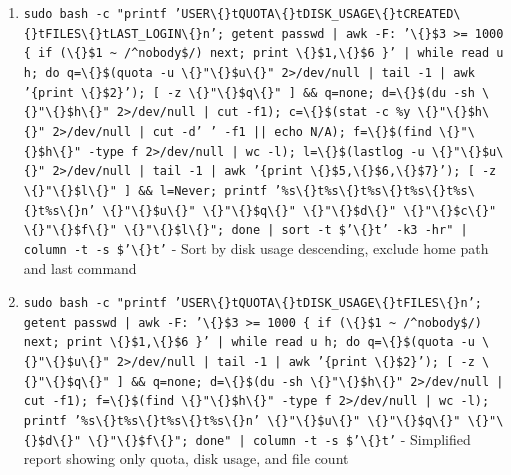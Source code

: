 \documentclass[openany]{book}
\begin{document}
\begin{enumerate}
  \item \texttt{sudo bash -c "printf 'USER\textbackslash\{\}tQUOTA\textbackslash\{\}tDISK\_USAGE\textbackslash\{\}tCREATED\textbackslash\{\}tFILES\textbackslash\{\}tLAST\_LOGIN\textbackslash\{\}n'; getent passwd | awk -F: '\textbackslash\{\}\$3 >= 1000 \{ if (\textbackslash\{\}\$1 \textasciitilde{} /\textasciicircum{}nobody\$/) next; print \textbackslash\{\}\$1,\textbackslash\{\}\$6 \}' | while read u h; do q=\textbackslash\{\}\$(quota -u \textbackslash\{\}"\textbackslash\{\}\$u\textbackslash\{\}" 2>/dev/null | tail -1 | awk '\{print \textbackslash\{\}\$2\}'); [ -z \textbackslash\{\}"\textbackslash\{\}\$q\textbackslash\{\}" ] \&\& q=none; d=\textbackslash\{\}\$(du -sh \textbackslash\{\}"\textbackslash\{\}\$h\textbackslash\{\}" 2>/dev/null | cut -f1); c=\textbackslash\{\}\$(stat -c \%y \textbackslash\{\}"\textbackslash\{\}\$h\textbackslash\{\}" 2>/dev/null | cut -d' ' -f1 || echo N/A); f=\textbackslash\{\}\$(find \textbackslash\{\}"\textbackslash\{\}\$h\textbackslash\{\}" -type f 2>/dev/null | wc -l); l=\textbackslash\{\}\$(lastlog -u \textbackslash\{\}"\textbackslash\{\}\$u\textbackslash\{\}" 2>/dev/null | tail -1 | awk '\{print \textbackslash\{\}\$5,\textbackslash\{\}\$6,\textbackslash\{\}\$7\}'); [ -z \textbackslash\{\}"\textbackslash\{\}\$l\textbackslash\{\}" ] \&\& l=Never; printf '\%s\textbackslash\{\}t\%s\textbackslash\{\}t\%s\textbackslash\{\}t\%s\textbackslash\{\}t\%s\textbackslash\{\}t\%s\textbackslash\{\}n' \textbackslash\{\}"\textbackslash\{\}\$u\textbackslash\{\}" \textbackslash\{\}"\textbackslash\{\}\$q\textbackslash\{\}" \textbackslash\{\}"\textbackslash\{\}\$d\textbackslash\{\}" \textbackslash\{\}"\textbackslash\{\}\$c\textbackslash\{\}" \textbackslash\{\}"\textbackslash\{\}\$f\textbackslash\{\}" \textbackslash\{\}"\textbackslash\{\}\$l\textbackslash\{\}"; done | sort -t \$'\textbackslash\{\}t' -k3 -hr" | column -t -s \$'\textbackslash\{\}t'} - Sort by disk usage descending, exclude home path and last command
  \item \texttt{sudo bash -c "printf 'USER\textbackslash\{\}tQUOTA\textbackslash\{\}tDISK\_USAGE\textbackslash\{\}tFILES\textbackslash\{\}n'; getent passwd | awk -F: '\textbackslash\{\}\$3 >= 1000 \{ if (\textbackslash\{\}\$1 \textasciitilde{} /\textasciicircum{}nobody\$/) next; print \textbackslash\{\}\$1,\textbackslash\{\}\$6 \}' | while read u h; do q=\textbackslash\{\}\$(quota -u \textbackslash\{\}"\textbackslash\{\}\$u\textbackslash\{\}" 2>/dev/null | tail -1 | awk '\{print \textbackslash\{\}\$2\}'); [ -z \textbackslash\{\}"\textbackslash\{\}\$q\textbackslash\{\}" ] \&\& q=none; d=\textbackslash\{\}\$(du -sh \textbackslash\{\}"\textbackslash\{\}\$h\textbackslash\{\}" 2>/dev/null | cut -f1); f=\textbackslash\{\}\$(find \textbackslash\{\}"\textbackslash\{\}\$h\textbackslash\{\}" -type f 2>/dev/null | wc -l); printf '\%s\textbackslash\{\}t\%s\textbackslash\{\}t\%s\textbackslash\{\}t\%s\textbackslash\{\}n' \textbackslash\{\}"\textbackslash\{\}\$u\textbackslash\{\}" \textbackslash\{\}"\textbackslash\{\}\$q\textbackslash\{\}" \textbackslash\{\}"\textbackslash\{\}\$d\textbackslash\{\}" \textbackslash\{\}"\textbackslash\{\}\$f\textbackslash\{\}"; done" | column -t -s \$'\textbackslash\{\}t'} - Simplified report showing only quota, disk usage, and file count

\end{enumerate}
\end{document}
